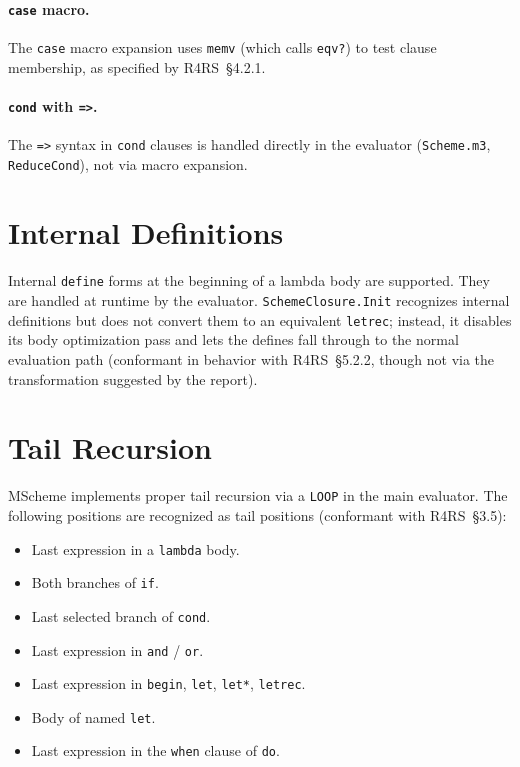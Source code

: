 \documentclass[12pt]{report}
\begin{document}
\paragraph{{\tt case} macro.}
The {\tt case} macro expansion uses {\tt memv} (which calls
{\tt eqv?}) to test clause membership, as specified by R4RS~\S4.2.1.

\paragraph{{\tt cond} with {\tt =>}.}
The {\tt =>} syntax in {\tt cond} clauses is handled directly in the
evaluator ({\tt Scheme.m3}, {\tt ReduceCond}), not via macro
expansion.

\section{Internal Definitions}

Internal {\tt define} forms at the beginning of a lambda body are
supported.  They are handled at runtime by the evaluator.
{\tt SchemeClosure.Init} recognizes internal definitions but does not
convert them to an equivalent {\tt letrec}; instead, it disables its
body optimization pass and lets the defines fall through to the
normal evaluation path (conformant in behavior with R4RS~\S5.2.2,
though not via the transformation suggested by the report).

\section{Tail Recursion}

MScheme implements proper tail recursion via a {\tt LOOP} in the main
evaluator.  The following positions are recognized as tail positions
(conformant with R4RS~\S3.5):

\begin{itemize}
\item Last expression in a {\tt lambda} body.
\item Both branches of {\tt if}.
\item Last selected branch of {\tt cond}.
\item Last expression in {\tt and} / {\tt or}.
\item Last expression in {\tt begin}, {\tt let}, {\tt let*}, {\tt letrec}.
\item Body of named {\tt let}.
\item Last expression in the {\tt when} clause of {\tt do}.
\end{itemize}
\end{document}

